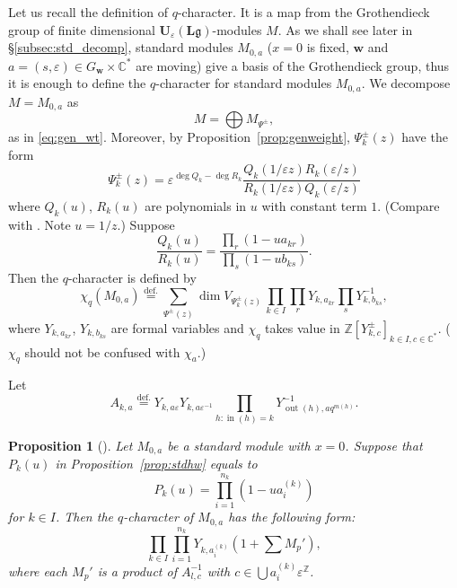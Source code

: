 \documentclass[12pt]{amsart}
\def\Bbb{\mathbb}
\newcommand{\rom}{\textup}
\newtheorem{Proposition}[equation]{Proposition}
\theoremstyle{definition}
\theoremstyle{remark}
\numberwithin{equation}{subsection}
\newcommand{\propref}[1]{Proposition~\ref{#1}}
\newcommand{\subsecref}[1]{\S\ref{#1}}
\newcommand{\defeq}{\overset{\operatorname{\scriptstyle def.}}{=}}
\newcommand{\C}{{\Bbb C}}
\newcommand{\Z}{{\Bbb Z}}
\newcommand{\vin}{\operatorname{in}} %
\newcommand{\vout}{\operatorname{out}} %
\newcommand{\bw}{{\mathbf w}} %
\newcommand{\Ule}{{\mathbf U}_{\varepsilon}({\mathbf L}\mathfrak g)}
\begin{document}
Let us recall the definition of $q$-character.
%
It is a map from the Grothendieck group of finite dimensional
$\Ule$-modules $M$. As we shall see later in
\subsecref{subsec:std_decomp}, standard modules $M_{0,a}$ ($x = 0$ is
fixed, $\bw$ and $a = (s,\varepsilon)\in G_\bw\times\C^*$ are moving)
give a basis of the Grothendieck group, thus it is enough to define
the $q$-character for standard modules $M_{0,a}$. We decompose $M =
M_{0,a}$ as
\begin{equation*}
   M = \bigoplus M_{\Psi^\pm},
\end{equation*}
as in \eqref{eq:gen_wt}.
Moreover, by \propref{prop:genweight}, $\Psi_k^\pm(z)$ have the form
\begin{equation}\label{eq:Q_k}
  \Psi_k^\pm(z) = \varepsilon^{\deg Q_k - \deg R_k}
  \frac{Q_k(1/\varepsilon z) R_k(\varepsilon/z)}
  {R_k(1/\varepsilon z)Q_k(\varepsilon/z)}
\end{equation}
where $Q_k(u)$, $R_k(u)$ are polynomials in $u$ with constant term
$1$.
(Compare with \cite[Proposition~1]{FR}. Note $u = 1/z$.)
Suppose
\begin{equation*}
   \frac{Q_k(u)}{R_k(u)}
   = \frac{\prod_{r} (1 - u a_{kr})}{\prod_s (1 - u b_{ks})}.
\end{equation*}
Then the $q$-character is defined by
\begin{equation*}
   \chi_q(M_{0,a}) \defeq
   \sum_{\Psi^\pm(z)}
   \dim V_{\Psi^\pm_k(z)}\,
   \prod_{k\in I}\prod_{r} Y_{k,a_{kr}} \prod_{s} Y_{k,b_{ks}}^{-1},
\end{equation*}
where $Y_{k,a_{kr}}$, $Y_{k,b_{ks}}$ are formal variables and $\chi_q$ 
takes value in $\Z[Y_{k,c}^{\pm}]_{k\in I, c\in \C^*}$.
($\chi_q$ should not be confused with $\chi_a$.)

Let
\begin{equation*}
  A_{k,a} \defeq
  Y_{k,a\varepsilon} Y_{k,a\varepsilon^{-1}}
  \prod_{h: \vin(h) = k} Y_{\vout(h), aq^{m(h)}}^{-1}.
\end{equation*}

\begin{Proposition}[]
Let $M_{0,a}$ be a standard module with $x = 0$.
Suppose that $P_k(u)$ in \propref{prop:stdhw} equals to
\begin{equation*}
   P_k(u) = \prod_{i=1}^{n_k} ( 1 - u a_i^{(k)})
\end{equation*}
for $k\in I$. Then the $q$-character of $M_{0,a}$ has the following
form\rom:
\begin{equation*}
   \prod_{k\in I} \prod_{i=1}^{n_k}
     Y_{k,a_i^{(k)}}\left(1+\sum M_p'\right),
\end{equation*}
where each $M_p'$ is a product of
$A_{l,c}^{-1}$ with $c\in \bigcup a_i^{(k)} \varepsilon^{\Z}$.
\end{Proposition}
\end{document}
